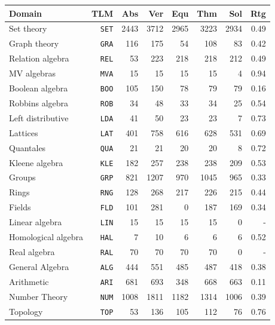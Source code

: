 \documentclass[runningheads]{llncs}
\begin{document}
\begin{table}[tb]
\begin{center}
\setlength{\tabcolsep}{4pt}
\begin{tabular}{lr|rr|rrrr}
Domain              & TLM       & Abs  & Ver  & Equ  & Thm  & Sol  & Rtg \\
\hline
Set theory          & {\tt SET} & 2443 & 3712 & 2965 & 3223 & 2934 & 0.49 \\
Graph theory        & {\tt GRA} &  116 &  175 &   54 &  108 &   83 & 0.42 \\
Relation algebra    & {\tt REL} &   53 &  223 &  218 &  218 &  212 & 0.49 \\
MV algebras         & {\tt MVA} &   15 &   15 &   15 &   15 &    4 & 0.94 \\
Boolean algebra     & {\tt BOO} &  105 &  150 &   78 &   79 &   79 & 0.16 \\
Robbins algebra     & {\tt ROB} &   34 &   48 &   33 &   34 &   25 & 0.54 \\
Left distributive   & {\tt LDA} &   41 &   50 &   23 &   23 &    7 & 0.73 \\
Lattices            & {\tt LAT} &  401 &  758 &  616 &  628 &  531 & 0.69 \\
Quantales           & {\tt QUA} &   21 &   21 &   20 &   20 &    8 & 0.72 \\
Kleene algebra      & {\tt KLE} &  182 &  257 &  238 &  238 &  209 & 0.53 \\
Groups              & {\tt GRP} &  821 & 1207 &  970 & 1045 &  965 & 0.33 \\
Rings               & {\tt RNG} &  128 &  268 &  217 &  226 &  215 & 0.44 \\
Fields              & {\tt FLD} &  101 &  281 &    0 &  187 &  169 & 0.34 \\
Linear algebra      & {\tt LIN} &   15 &   15 &   15 &   15 &    0 & -    \\
Homological algebra & {\tt HAL} &    7 &   10 &    6 &    6 &    6 & 0.52 \\
Real algebra        & {\tt RAL} &   70 &   70 &   70 &   70 &    0 & -    \\
General Algebra     & {\tt ALG} &  444 &  551 &  485 &  487 &  418 & 0.38 \\
Arithmetic          & {\tt ARI} &  681 &  693 &  348 &  668 &  663 & 0.11 \\
Number Theory       & {\tt NUM} & 1008 & 1811 & 1182 & 1314 & 1006 & 0.39 \\
Topology            & {\tt TOP} &   53 &  136 &  105 &  112 &   76 & 0.76 \\

\end{tabular}
\end{center}
\end{table}
\end{document}
